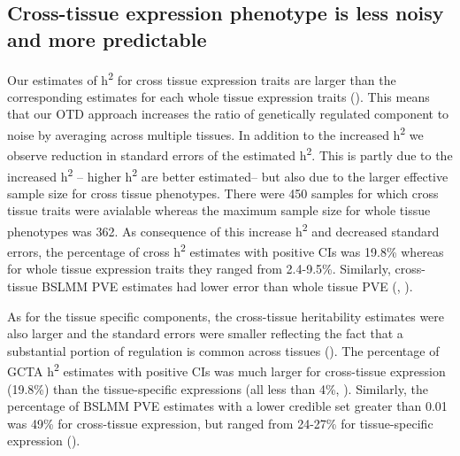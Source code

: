 \documentclass[10pt,letterpaper]{article}
\begin{document}
\subsection*{Cross-tissue expression phenotype is less noisy and more predictable}%


Our estimates of h\textsuperscript{2} for cross tissue expression traits are larger than the corresponding estimates for each whole tissue expression traits (). %
This means that our OTD approach increases the ratio of genetically regulated component to noise by averaging across multiple tissues. In addition to the increased h\textsuperscript{2} we observe reduction in standard errors of the estimated h\textsuperscript{2}. This is partly due to the increased h\textsuperscript{2} -- higher h\textsuperscript{2} are better estimated-- but also due to the larger effective sample size for cross tissue phenotypes. There were 450 samples for which cross tissue traits were avialable whereas the maximum sample size for whole tissue phenotypes was 362. As consequence of this increase h\textsuperscript{2} and decreased standard errors, the percentage of cross h\textsuperscript{2} estimates with positive CIs was 19.8\% whereas for whole tissue expression traits they ranged from 2.4-9.5\%. Similarly, cross-tissue BSLMM PVE estimates had lower error than whole tissue PVE (, ). 

As for the tissue specific components, 
the cross-tissue heritability estimates were also larger and the standard errors were smaller reflecting the fact that a substantial portion of regulation is common across tissues (). The percentage of GCTA h\textsuperscript{2} estimates with positive CIs was much larger for cross-tissue expression (19.8\%) than the tissue-specific expressions (all less than 4\%, ). Similarly, the percentage of BSLMM PVE estimates with a lower credible set greater than 0.01 was 49\% for cross-tissue expression, but ranged from 24-27\% for tissue-specific expression ().
\end{document}
